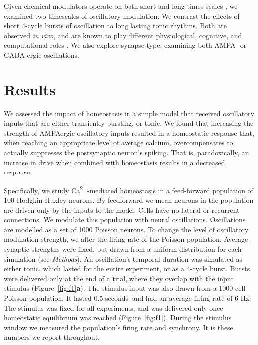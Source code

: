 \documentclass{article}
\begin{document}
Given chemical modulators operate on both short and long times scales \cite{Marinelli2014,Marder2014,Cohen2015,Daw2002}, we examined two timescales of oscillatory modulation. We contrast the effects of short 4-cycle bursts of oscillation to long lasting tonic rhythms. Both are observed {\textit{in vivo}}, and are known to play different physiological, cognitive, and computational roles \cite{Lundqvist2016,vanEde2018,Peterson2017}. We also explore synapse type, examining both AMPA- or GABA-ergic oscillations. 


\section*{Results}
We assessed the impact of homeostasis in a simple model that received oscillatory inputs that are either transiently bursting, or tonic. We found that increasing the strength of AMPAergic oscillatory inputs resulted in a homeostatic response that, when reaching an appropriate level of average calcium, overcompensates to actually suppresses the postsynaptic neuron's spiking. That is, paradoxically, an increase in drive when combined with homeostasis results in a decreased response. 

Specifically, we study Ca\textsuperscript{2+}-mediated homeostasis in a feed-forward population of 100 Hodgkin-Huxley neurons. By feedforward we mean neurons in the population are driven only by the inputs to the model. Cells have no lateral or recurrent connections. We modulate this population with neural oscillations. Oscillations are modelled as a set of 1000 Poisson neurons. To change the level of oscillatory modulation strength, we alter the firing rate of the Poisson population. Average synaptic strengths were fixed, but drawn from a uniform distribution for each simulation (see \textit{Methods}). An oscillation's temporal duration was simulated as either tonic, which lasted for the entire experiment, or as a 4-cycle burst. Bursts were delivered only at the end of a trial, where they overlap with the input stimulus (Figure~\ref{fig:f1}\textbf{a}). The stimulus input was also drawn from a 1000 cell Poisson population. It lasted 0.5 seconds, and had an average firing rate of 6 Hz. The stimulus was fixed for all experiments, and was delivered only once homeostatic equilibrium was reached \cite{Barth2012} (Figure~\ref{fig:f1}). During the stimulus window we measured the population's firing rate and synchrony. It is these numbers we report throughout.
\end{document}
